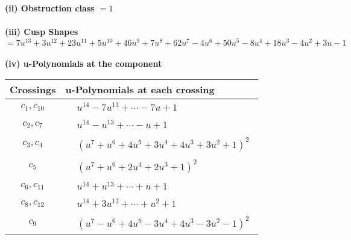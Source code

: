 \documentclass[1p]{elsarticle_modified}
\theoremstyle{definition}
\begin{document}
\flushleft \textbf{(ii) Obstruction class $= 1$}\\~\\
\flushleft \textbf{(iii) Cusp Shapes $= 7 u^{13}+3 u^{12}+23 u^{11}+5 u^{10}+46 u^9+7 u^8+62 u^7-4 u^6+50 u^5-8 u^4+18 u^3-4 u^2+3 u-1$}\\~\\
\newpage\renewcommand{\arraystretch}{1}
\flushleft \textbf{(iv) u-Polynomials at the component}\newline \\
\begin{tabular}{m{50pt}|m{274pt}}
Crossings & \hspace{64pt}u-Polynomials at each crossing \\
\hline $$\begin{aligned}c_{1},c_{10}\end{aligned}$$&$\begin{aligned}
&u^{14}-7 u^{13}+\cdots-7 u+1
\end{aligned}$\\
\hline $$\begin{aligned}c_{2},c_{7}\end{aligned}$$&$\begin{aligned}
&u^{14}- u^{13}+\cdots- u+1
\end{aligned}$\\
\hline $$\begin{aligned}c_{3},c_{4}\end{aligned}$$&$\begin{aligned}
&(u^7+u^6+4 u^5+3 u^4+4 u^3+3 u^2+1)^2
\end{aligned}$\\
\hline $$\begin{aligned}c_{5}\end{aligned}$$&$\begin{aligned}
&(u^7+u^6+2 u^4+2 u^3+1)^2
\end{aligned}$\\
\hline $$\begin{aligned}c_{6},c_{11}\end{aligned}$$&$\begin{aligned}
&u^{14}+u^{13}+\cdots+u+1
\end{aligned}$\\
\hline $$\begin{aligned}c_{8},c_{12}\end{aligned}$$&$\begin{aligned}
&u^{14}+3 u^{12}+\cdots+u^2+1
\end{aligned}$\\
\hline $$\begin{aligned}c_{9}\end{aligned}$$&$\begin{aligned}
&(u^7- u^6+4 u^5-3 u^4+4 u^3-3 u^2-1)^2
\end{aligned}$\\
\hline
\end{tabular}\\~\\
\end{document}
